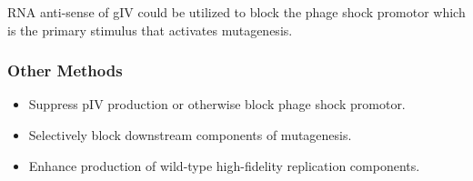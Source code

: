 \documentclass[10pt,letterpaper]{article}
\begin{document}
RNA anti-sense of gIV could be utilized to block the phage shock promotor which is the primary stimulus that activates mutagenesis.

\subsubsection*{Other Methods}
\begin{itemize}
	\item Suppress pIV production or otherwise block phage shock promotor.
	\item Selectively block downstream components of mutagenesis.
	\item Enhance production of wild-type high-fidelity replication components.
\end{itemize}

%




\end{document}
